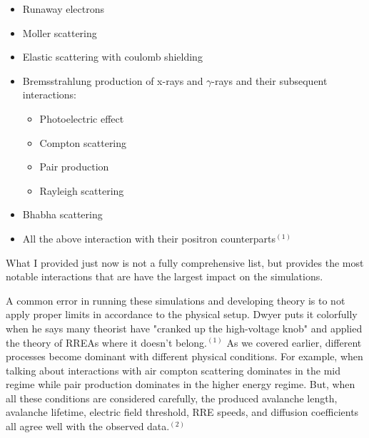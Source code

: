 \documentclass[11pt]{article}
\begin{document}
\begin{multicols*}{2}
    \begin{itemize}
    \item Runaway electrons
        \item Moller scattering
        \item Elastic scattering with coulomb shielding
        \item Bremsstrahlung production of x-rays and $\gamma$-rays and their subsequent interactions:
        \begin{itemize}
            \item Photoelectric effect
            \item Compton scattering
            \item Pair production
            \item Rayleigh scattering
        \end{itemize}
        \item Bhabha scattering
        \item All the above interaction with their positron counterparts$^{(1)}$
    \end{itemize}
    What I provided just now is not a fully comprehensive list, but provides the most notable interactions that are have the largest impact on the simulations. 
    
    A common error in running these simulations and developing theory is to not apply proper limits in accordance to the physical setup. Dwyer puts it colorfully when he says many theorist have "cranked up the high-voltage knob" and applied the theory of RREAs where it doesn't belong.$^{(1)}$ As we covered earlier, different processes become dominant with different physical conditions. For example, when talking about interactions with air compton scattering dominates in the mid regime while pair production dominates in the higher energy regime. But, when all these conditions are considered carefully, the produced avalanche length, avalanche lifetime, electric field threshold, RRE speeds, and diffusion coefficients all agree well with the observed data.$^{(2)}$
    

\end{multicols*}
\end{document}
